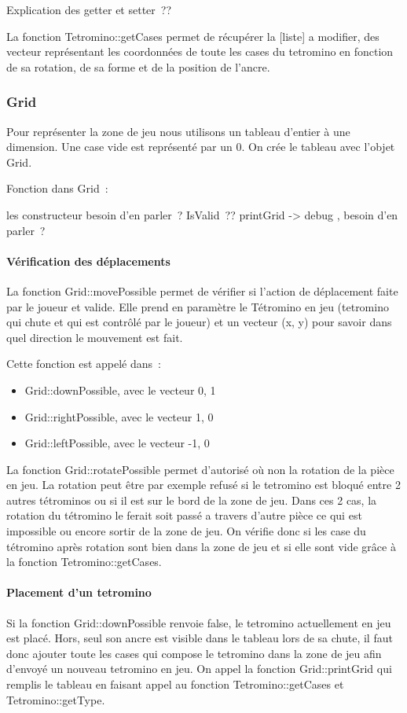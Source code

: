 \documentclass[a4paper, 12pt]{article}
\begin{document}
			Explication des getter et setter ??

			La fonction Tetromino::getCases permet de récupérer la [liste] a modifier, des vecteur représentant les coordonnées de toute les cases du tetromino en fonction de sa rotation, de sa forme et de la position de l’ancre.

		\subsubsection{Grid}
			Pour représenter la zone de jeu nous utilisons un tableau d’entier à une dimension. Une case vide est représenté par un 0. 
			On crée le tableau avec l’objet Grid.

			Fonction dans Grid :

			les constructeur besoin d’en parler ?
			IsValid ??
			printGrid -> debug , besoin d’en parler ?

			\paragraph{Vérification des déplacements}
				La fonction Grid::movePossible permet de vérifier si l’action de déplacement faite par le joueur et valide. Elle prend en paramètre le Tétromino en jeu (tetromino qui chute et qui est contrôlé par le joueur) et un vecteur (x, y) pour savoir dans quel direction le mouvement est fait.

				Cette fonction est appelé dans : 
				\begin{itemize}
					\item Grid::downPossible, avec le vecteur {0, 1}
					\item Grid::rightPossible, avec le vecteur {1, 0}
					\item Grid::leftPossible, avec le vecteur {-1, 0}
				\end{itemize}

				La fonction Grid::rotatePossible permet d’autorisé où non la rotation de la pièce en jeu. La rotation peut être par exemple refusé si le tetromino est bloqué entre 2 autres tétrominos ou si il est sur le bord de la zone de jeu. Dans ces 2 cas, la rotation du tétromino le ferait soit passé a travers d’autre pièce ce qui est impossible ou encore sortir de la zone de jeu. On vérifie donc si les case du tétromino après rotation sont bien dans la zone de jeu et si elle sont vide grâce à la fonction Tetromino::getCases.

			\paragraph{Placement d’un tetromino}
				Si la fonction Grid::downPossible renvoie false, le tetromino actuellement en jeu est placé. Hors, seul son ancre est visible dans le tableau lors de sa chute, il faut donc ajouter toute les cases qui compose le tetromino dans la zone de jeu afin d’envoyé un nouveau tetromino en jeu.
				On appel la fonction Grid::printGrid qui remplis le tableau en faisant appel au fonction Tetromino::getCases et Tetromino::getType.
\end{document}
